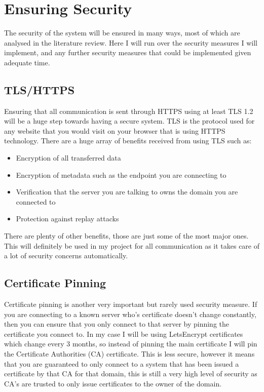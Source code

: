 \section{Ensuring Security}
The security of the system will be ensured in many ways, most of which are analysed in the literature review. Here I will run over the security measures I will implement, and any further security measures that could be implemented given adequate time.

\subsection{TLS/HTTPS}
Ensuring that all communication is sent through HTTPS using at least TLS 1.2 will be a huge step towards having a secure system. TLS is the protocol used for any website that you would visit on your browser that is using HTTPS technology. There are a huge array of benefits received from using TLS such as: 
\begin{itemize}
	\item Encryption of all transferred data
	\item Encryption of metadata such as the endpoint you are connecting to
	\item Verification that the server you are talking to owns the domain you are connected to
	\item Protection against replay attacks
\end{itemize}
There are plenty of other benefits, those are just some of the most major ones. This will definitely be used in my project for all communication as it takes care of a lot of security concerns automatically.

\subsection{Certificate Pinning}
Certificate pinning is another very important but rarely used security measure. If you are connecting to a known server who's certificate doesn't change constantly, then you can ensure that you only connect to that server by pinning the certificate you connect to. In my case I will be using LetsEncrypt certificates which change every 3 months, so instead of pinning the main certificate I will pin the Certificate Authorities (CA) certificate. This is less secure, however it means that you are guaranteed to only connect to a system that has been issued a certificate by that CA for that domain, this is still a very high level of security as CA's are trusted to only issue certificates to the owner of the domain.

